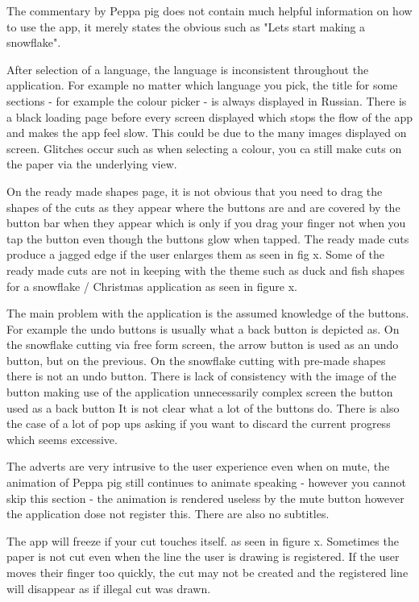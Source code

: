 \documentclass[11pt]{article}
\begin{document}
                The commentary by Peppa pig does not contain much helpful information on how to use the app, it merely states the obvious such as "Lets start making a snowflake".
                
                After selection of a language, the language is inconsistent throughout the application. For example no matter which language you pick, the title for some sections - for example the colour picker - is always displayed in Russian. There is a black loading page before every screen displayed which stops the flow of the app and makes the app feel slow. This could be due to the many images displayed on screen. Glitches occur such as when selecting a colour, you ca still make cuts on the paper via the underlying view. 
                
                On the ready made shapes page, it is not obvious that you need to drag the shapes of the cuts as they appear where the buttons are and are covered by the button bar when they appear which is only if you drag your finger not when you tap the button even though the buttons glow when tapped. The ready made cuts produce a jagged edge if the user enlarges them as seen in fig x. Some of the ready made cuts are not in keeping with the theme such as duck and fish shapes for a snowflake / Christmas application as seen in figure x. 
                
                The main problem with the application is the assumed knowledge of the buttons. For example the undo buttons is usually what a back button is depicted as. On the snowflake cutting via free form screen, the arrow button is used as an undo button, but on the previous. On the snowflake cutting with pre-made shapes there is not an undo button. There is lack of consistency with the image of the button making use of the application unnecessarily complex screen the button used as a back button It is not clear what a lot of the buttons do. There is also the case of a lot of pop ups asking if you want to discard the current progress which seems excessive. 
                
                The adverts are very intrusive to the user experience even when on mute, the animation of Peppa pig still continues to animate speaking - however you cannot skip this section - the animation is rendered useless by the mute button however the application dose not register this. There are also no subtitles.
                
                The app will freeze if your cut touches itself. as seen in figure x. Sometimes the paper is not cut even when the line the user is drawing is registered. If the user moves their finger too quickly, the cut may not be created and the registered line will disappear as if illegal cut was drawn. 
                
\end{document}
